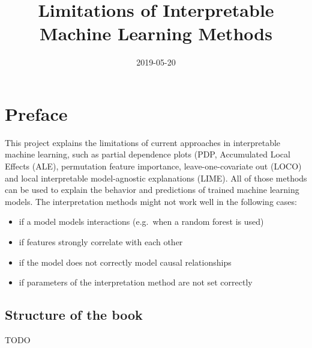 \documentclass[
]{krantz}
\title{Limitations of Interpretable Machine Learning Methods}
\date{2019-05-20}
\providecommand{\tightlist}{%
  \setlength{\itemsep}{0pt}\setlength{\parskip}{0pt}}
\begin{document}
\maketitle


\thispagestyle{empty}

\begin{center}
\end{center}

\setlength{\abovedisplayskip}{-5pt}
\setlength{\abovedisplayshortskip}{-5pt}

{
\hypersetup{linkcolor=}
\setcounter{tocdepth}{2}
\tableofcontents
}
\listoftables
\listoffigures
\hypertarget{preface}{%
\chapter*{Preface}\label{preface}}


This project explains the limitations of current approaches in interpretable machine learning, such as partial dependence plots (PDP, Accumulated Local Effects (ALE), permutation feature importance, leave-one-covariate out (LOCO) and local interpretable model-agnostic explanations (LIME).
All of those methods can be used to explain the behavior and predictions of trained machine learning models.
The interpretation methods might not work well in the following cases:

\begin{itemize}
\tightlist
\item
  if a model models interactions (e.g.~when a random forest is used)
\item
  if features strongly correlate with each other
\item
  if the model does not correctly model causal relationships
\item
  if parameters of the interpretation method are not set correctly
\end{itemize}

\hypertarget{structure-of-the-book}{%
\section*{Structure of the book}\label{structure-of-the-book}}


TODO

\mainmatter
\end{document}

